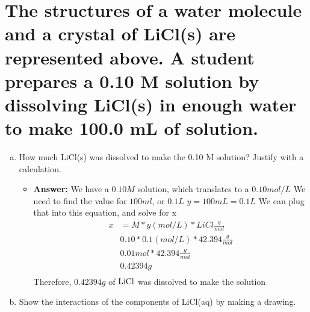 \documentclass{scrartcl}
\begin{document}
\section{The structures of a water molecule and a crystal of LiCl(s) are represented above. A student prepares a 0.10 M solution by dissolving LiCl(s) in enough water to make 100.0 mL of solution.}
\label{sec:org4a64b96}
\begin{enumerate}[(a)]
\item How much LiCl(s) was dissolved to make the 0.10 M solution? Justify with a
calculation.
\begin{itemize}
\item \textbf{Answer:} We have a \(0.10M\) solution, which translates to  a \(0.10mol/L\)
We need to find the value for \(100ml\), or \(0.1L\)
\(y = 100mL = 0.1L\)
We can plug that into this equation, and solve for x
\begin{align*}
x&= M * y(mol/L) * LiCl\frac{g}{mol}\\
&0.10 * 0.1(mol/L) * 42.394\frac{g}{mol}\\
&0.01mol * 42.394\frac{g}{mol}\\
&0.42394g\\
\end{align*}
Therefore, \(0.42394g\) of \(\ce{LiCl}\) was dissolved to make the solution
\end{itemize}

\item Show the interactions of the components of LiCl(aq) by making a drawing.
\end{enumerate}
\end{document}

